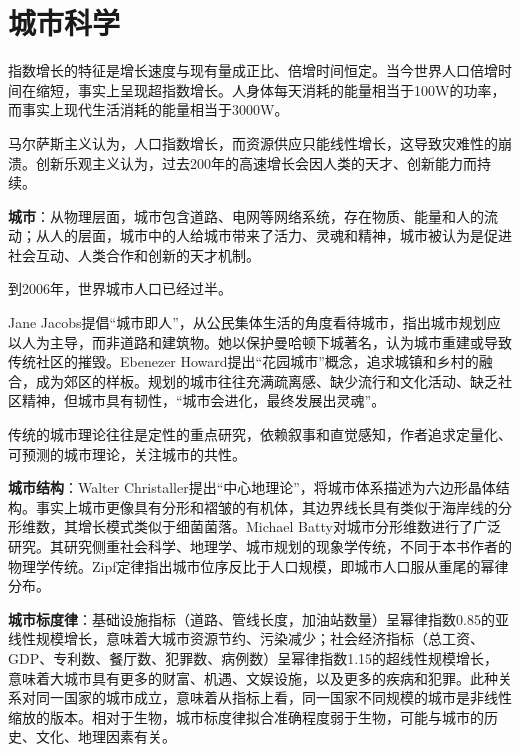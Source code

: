 \section{城市科学}

\par 指数增长的特征是增长速度与现有量成正比、倍增时间恒定。当今世界人口倍增时间在缩短，事实上呈现超指数增长。人身体每天消耗的能量相当于100W的功率，而事实上现代生活消耗的能量相当于3000W。

\par 马尔萨斯主义认为，人口指数增长，而资源供应只能线性增长，这导致灾难性的崩溃。创新乐观主义认为，过去200年的高速增长会因人类的天才、创新能力而持续。

\par \textbf{城市}：从物理层面，城市包含道路、电网等网络系统，存在物质、能量和人的流动；从人的层面，城市中的人给城市带来了活力、灵魂和精神，城市被认为是促进社会互动、人类合作和创新的天才机制。

\par 到2006年，世界城市人口已经过半。

\par Jane Jacobs提倡“城市即人”，从公民集体生活的角度看待城市，指出城市规划应以人为主导，而非道路和建筑物。她以保护曼哈顿下城著名，认为城市重建或导致传统社区的摧毁。Ebenezer Howard提出“花园城市”概念，追求城镇和乡村的融合，成为郊区的样板。规划的城市往往充满疏离感、缺少流行和文化活动、缺乏社区精神，但城市具有韧性，“城市会进化，最终发展出灵魂”。

\par 传统的城市理论往往是定性的重点研究，依赖叙事和直觉感知，作者追求定量化、可预测的城市理论，关注城市的共性。

\par \textbf{城市结构}：Walter Christaller提出“中心地理论”，将城市体系描述为六边形晶体结构。事实上城市更像具有分形和褶皱的有机体，其边界线长具有类似于海岸线的分形维数，其增长模式类似于细菌菌落。Michael Batty对城市分形维数进行了广泛研究。其研究侧重社会科学、地理学、城市规划的现象学传统，不同于本书作者的物理学传统。Zipf定律指出城市位序反比于人口规模，即城市人口服从重尾的幂律分布。

\par \textbf{城市标度律}：基础设施指标（道路、管线长度，加油站数量）呈幂律指数0.85的亚线性规模增长，意味着大城市资源节约、污染减少；社会经济指标（总工资、GDP、专利数、餐厅数、犯罪数、病例数）呈幂律指数1.15的超线性规模增长，意味着大城市具有更多的财富、机遇、文娱设施，以及更多的疾病和犯罪。此种关系对同一国家的城市成立，意味着从指标上看，同一国家不同规模的城市是非线性缩放的版本。相对于生物，城市标度律拟合准确程度弱于生物，可能与城市的历史、文化、地理因素有关。

